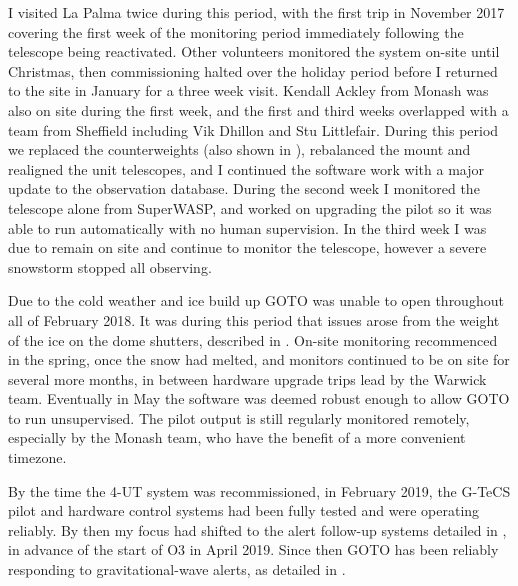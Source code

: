\begin{colsection}
I visited La Palma twice during this period, with the first trip in November 2017 covering the first week of the monitoring period immediately following the telescope being reactivated. Other volunteers monitored the system on-site until Christmas, then commissioning halted over the holiday period before I returned to the site in January for a three week visit. Kendall Ackley from Monash was also on site during the first week, and the first and third weeks overlapped with a team from Sheffield including Vik Dhillon and Stu Littlefair. During this period we replaced the counterweights (also shown in ), rebalanced the mount and realigned the unit telescopes, and I continued the software work with a major update to the observation database. During the second week I monitored the telescope alone from SuperWASP, and worked on upgrading the pilot so it was able to run automatically with no human supervision. In the third week I was due to remain on site and continue to monitor the telescope, however a severe snowstorm stopped all observing.

Due to the cold weather and ice build up GOTO was unable to open throughout all of February 2018. It was during this period that issues arose from the weight of the ice on the dome shutters, described in . On-site monitoring recommenced in the spring, once the snow had melted, and monitors continued to be on site for several more months, in between hardware upgrade trips lead by the Warwick team. Eventually in May the software was deemed robust enough to allow GOTO to run unsupervised. The pilot output is still regularly monitored remotely, especially by the Monash team, who have the benefit of a more convenient timezone.

By the time the 4-UT system was recommissioned, in February 2019, the G-TeCS pilot and hardware control systems had been fully tested and were operating reliably. By then my focus had shifted to the alert follow-up systems detailed in , in advance of the start of O3 in April 2019. Since then GOTO has been reliably responding to gravitational-wave alerts, as detailed in .

\end{colsection}



